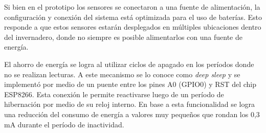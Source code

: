 Si bien en el prototipo los sensores se conectaron a una fuente de alimentación, la configuración y conexión del sistema está optimizada para el uso de baterías. Esto responde a que estos sensores estarán desplegados en múltiples ubicaciones dentro del invernadero, donde no siempre es posible alimentarlos con una fuente de energía. 

El ahorro de energía se logra al utilizar ciclos de apagado en los períodos donde no se realizan lecturas. A este mecanismo se lo conoce como \textit{deep sleep} y se implementó por medio de un puente entre los pines A0 (GPIO0) y RST del chip ESP8266. Esta conexión le permite reactivarse luego de un período de hibernación por medio de su reloj interno. En base a esta funcionalidad se logra una reducción del consumo de energía a valores muy pequeños que rondan los 0,3 mA durante el período de inactividad.




